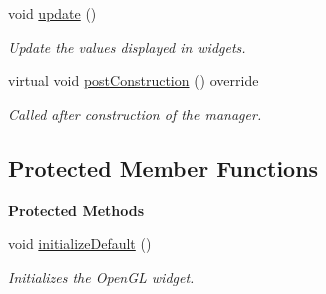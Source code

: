 \begin{Indent}
\begin{DoxyCompactItemize}
\mbox{\label{classrev_1_1_view_1_1_widget_manager_a50765072e13fab9711947ce4038b07da}} 
void \mbox{\hyperlink{classrev_1_1_view_1_1_widget_manager_a50765072e13fab9711947ce4038b07da}{update}} ()
\begin{DoxyCompactList}\small\item\em Update the values displayed in widgets. \end{DoxyCompactList}\item 
\mbox{\label{classrev_1_1_view_1_1_widget_manager_a0e3c8b58975856e332fd82a32dd37880}} 
virtual void \mbox{\hyperlink{classrev_1_1_view_1_1_widget_manager_a0e3c8b58975856e332fd82a32dd37880}{post\+Construction}} () override
\begin{DoxyCompactList}\small\item\em Called after construction of the manager. \end{DoxyCompactList}\end{DoxyCompactItemize}
\end{Indent}
\subsection*{Protected Member Functions}
\begin{Indent}\textbf{ Protected Methods}\par
\begin{DoxyCompactItemize}
\item 
\mbox{\label{classrev_1_1_view_1_1_widget_manager_a5c2cca37c4e1accc99ac76b3ac779466}} 
void \mbox{\hyperlink{classrev_1_1_view_1_1_widget_manager_a5c2cca37c4e1accc99ac76b3ac779466}{initialize\+Default}} ()
\begin{DoxyCompactList}\small\item\em Initializes the Open\+GL widget. \end{DoxyCompactList}\end{DoxyCompactItemize}
\end{Indent}
